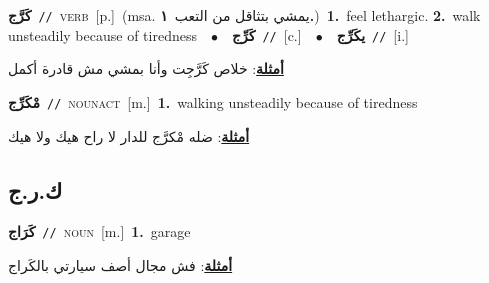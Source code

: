 \documentclass[10pt,a4paper,twoside]{article} %
\begin{document}
\begin{multicols}{2}
{\setlength\topsep{0pt}\textbf{\foreignlanguage{arabic}{كَرَّج}}\ {\color{gray}\texttt{//}\color{black}}\ \textsc{verb}\ [p.]\ \color{gray}(msa. \foreignlanguage{arabic}{يمشي بتثاقل من التعب}~\foreignlanguage{arabic}{\textbf{١.}})\color{black}\ \textbf{1.}~feel lethargic.  \textbf{2.}~walk unsteadily because of tiredness\ \ $\bullet$\ \ \setlength\topsep{0pt}\textbf{\foreignlanguage{arabic}{كَرِّج}}\ {\color{gray}\texttt{//}\color{black}}\ [c.]\ \ $\bullet$\ \ \setlength\topsep{0pt}\textbf{\foreignlanguage{arabic}{يكَرِّج}}\ {\color{gray}\texttt{//}\color{black}}\ [i.]\  \begin{flushright}\color{gray}\foreignlanguage{arabic}{\textbf{\underline{\foreignlanguage{arabic}{أمثلة}}}: خلاص كَرَّجِت وأنا بمشي مش قادرة أكمل}\end{flushright}\color{black}} \vspace{2mm}

{\setlength\topsep{0pt}\textbf{\foreignlanguage{arabic}{مْكَرِّج}}\ {\color{gray}\texttt{//}\color{black}}\ \textsc{noun\textunderscore act}\ [m.]\ \textbf{1.}~walking unsteadily because of tiredness\  \begin{flushright}\color{gray}\foreignlanguage{arabic}{\textbf{\underline{\foreignlanguage{arabic}{أمثلة}}}: ضله مْكرَّج للدار لا راح هيك ولا هيك}\end{flushright}\color{black}} \vspace{2mm}

\vspace{-3mm}
\subsection*{\color{blue}\foreignlanguage{arabic}{ك.ر.ج}\color{blue}{ (ntws)}} 

{\setlength\topsep{0pt}\textbf{\foreignlanguage{arabic}{كَرَاج}}\ {\color{gray}\texttt{//}\color{black}}\ \textsc{noun}\ [m.]\ \textbf{1.}~garage\  \begin{flushright}\color{gray}\foreignlanguage{arabic}{\textbf{\underline{\foreignlanguage{arabic}{أمثلة}}}: فش مجال أصف سيارتي بالكَراج}\end{flushright}\color{black}} \vspace{2mm}


\end{multicols}
\end{document}

